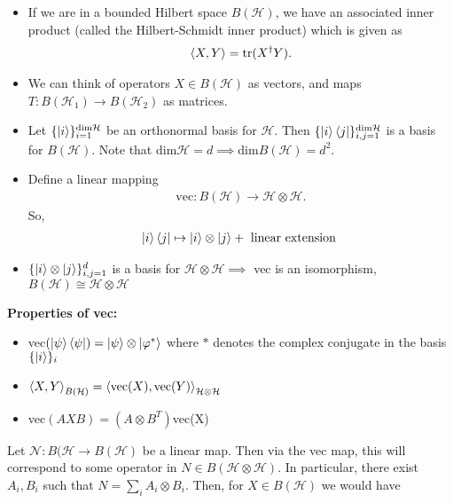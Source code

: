 \documentclass[10pt,oneside,longbibliography]{report}
\begin{document}
\begin{itemize}
    \item If we are in a bounded Hilbert space $B(\mathcal{H})$, we have an associated inner product (called the Hilbert-Schmidt inner product) which is given as
\begin{align}
    \braket{X,Y}=\text{tr}(X^{\dagger}Y). 
\end{align}
    \item We can think of operators $X\in B(\mathcal{H})$ as vectors, and maps $T:B(\mathcal{H}_1)\rightarrow B(\mathcal{H}_2)$ as matrices. 
    
    \item Let $\{\ket{i}\}_{i=1}^{\text{dim}\mathcal{H}}$ be an orthonormal basis for $\mathcal{H}$. Then $\{\ket{i}\bra{j}\}_{i,j=1}^{\text{dim}\mathcal{H}}$ is a basis for $B(\mathcal{H})$. Note that $\text{dim}\mathcal{H}=d \implies \text{dim}B(\mathcal{H})=d^2$. 
    
    \item Define a linear mapping 
    \begin{align}
        \text{vec}: B(\mathcal{H})\rightarrow \mathcal{H}\otimes \mathcal{H}.
    \end{align}
    So, 
    \begin{align}
        \ket{i}\bra{j} \mapsto \ket{i}\otimes \ket{j} + \text{ linear extension }
    \end{align}
    \item  $\{\ket{i}\otimes \ket{j}\}_{i,j=1}^d$ is a basis for $\mathcal{H} \otimes \mathcal{H} \implies$ vec is an isomorphism, $B(\mathcal{H}) \cong \mathcal{H} \otimes \mathcal{H}$
\end{itemize}
\textbf{Properties of vec:}
\begin{itemize}
    \item vec$(\ket{\psi}\bra{\psi}) = \ket{\psi} \otimes \ket{{\varphi}^*}$ where $*$ denotes the complex conjugate in the basis $\{\ket{i}\}_i$
    \item $\braket{X,Y}_{B(\mathcal{H})}=\braket{\text{vec}(X),\text{vec}(Y)}_{\mathcal{H}\otimes \mathcal{H}}$
    \item vec$(A X B)=(A\otimes B^{T})$vec(X)
\end{itemize}
Let $\mathcal{N}: B(\mathcal{H}\rightarrow B(\mathcal{H}) $ be a linear map. Then via the vec map, this will correspond to some operator in $N \in B(\mathcal{H}\otimes \mathcal{H})$. In particular, there exist $A_i, B_i$ such that $N=\sum_i A_i \otimes B_i$. Then, for $X\in B(\mathcal{H})$ we would have 
\end{document}
